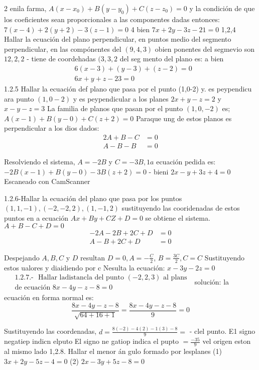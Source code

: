 2 enila farma, $A\left(x-x_0\right)+B\left(y-y_0\right)+C\left(z-z_0\right)=0$ y la condición de que los coeficientes sean proporcionales a las componentes dadas entonces: $7(x-4)+2(y+2)-3(z-1)=0$ 4 bien $7 x+2 y-3 z-21=0$
1,2,4 Hallar la ecuación del plano perpendicular, en puntos medio del segmento perpendicular, en las compónentes del $(9,4,3)$ obien ponentes del segmevio son $12,2,2$ - tiene de coordehadas $(3,3,2$ del seg mento del plano es:
a bien
$$
\begin{aligned}
	& 6(x-3)+(y-3)+(z-2)=0 \\
	& 6 x+y+z-23=0
\end{aligned}
$$
1.2.5 Hallar la ecuación def plano que pasa por el
punto (1,0-2) y. es peypendicu ara punto $(1,0-2)$ y es peypendicular a los planes $2 x+y-z=2$ y $x-y-z=3$
La familia de planos que pasan por el punto $(1,0,-2)$ es; $A(x-1)+B(y-0)+C(z+2)=0$ Paraque ung de estos planos es perpendicular
a los dios dados:
$$
\begin{aligned}
	2 A+B-C & =0 \\
	A-B-B & =0
\end{aligned}
$$

Resolviendo el sistema, $A=-2 B$ y $C=-3 B, 1 a$ ecuación pedida es:
$-2 B(x-1)+B(y-0)-3 B(z+2)=0$
- bieni $2 x-y+3 z+4=0$
Escaneado con CamScanner




1.2.6-Hallar la ecuación del plano que pasa por los puntos $(1,1,-1),(-2,-2,2),(1,-1,2)$ sustituyendo las cooridenadas de estos puntos en a ecuación $A x+B y+C Z+D=0$ se obtiene el sistema. $A+B-C+D=0$
$$
\begin{aligned}
	-2 A-2 B+2 C+D & =0 \\
	A-B+2 C+D & =0
\end{aligned}
$$

Despejando $A, B, C$ y $D$ resultan $D=0, A=-\frac{C}{2}$,
$B=\frac{3 C}{2}, C=C$
Sustituyendo estos ualores y diaidiendo por c Nesulta la ecuación: $x-3 y-2 z=0$
$\begin{aligned} & \text { 1.2.7.- } \text { Hallar ladistancla del punto }(-2,2,3) \text { al plans } \\ & \text { de ecuación } 8 x-4 y-z-8=0\end{aligned}$
solución: la ecuación en forma normal es:
$$
\frac{8 x-4 y-z-8}{\sqrt{64+16+1}}=\frac{8 x-4 y-z-8}{9}=0
$$

Sustituyendo las coordenadas, $d=\frac{8(-2)-4(2)-1(3)-8}{9}=$ -
clel punto.
E1 signo negatiep indicn elputo
El signo ne gatiop indica el pupto $=\frac{-35}{9}$
vel origen eston al mismo lado
1,2.8. Hallar el menor án gulo formado por lesplanes
(1) $3 x+2 y-5 z-4=0$
(2) $2 x-3 y+5 z-8=0$

